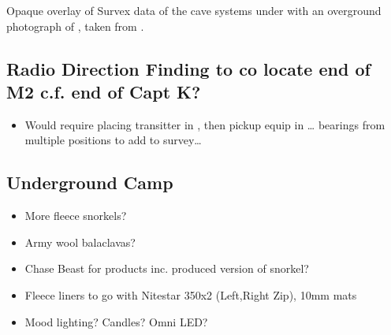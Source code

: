 \begin{survey}
\centering
{}
\caption[Overlay of pre-2009 Survex data with an overground photograph of Tolminski Migovec]{Opaque overlay of Survex data of the cave systems under  with an overground photograph of , taken from .}
\end{survey}


    \subsection{Radio Direction Finding to co locate end of M2 c.f. end of Capt K?}
        \begin{itemize}
            \item Would require placing transitter in , then pickup equip in \ldots{} bearings from multiple positions to add to survey\ldots{}
        \end{itemize}

    \subsection{Underground Camp}
        \begin{itemize}
            \item More fleece snorkels?
            \item Army wool balaclavas?
            \item Chase Beast for products inc. produced version of snorkel?
            \item Fleece liners to go with Nitestar 350x2 (Left,Right Zip), 10mm mats
            \item Mood lighting? Candles? Omni LED?
        \end{itemize}      
        
